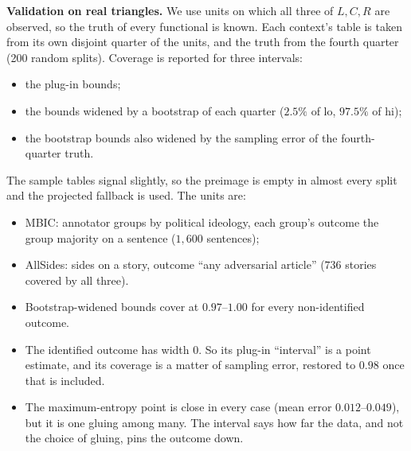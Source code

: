 \documentclass[11pt]{article}
\theoremstyle{definition}
\theoremstyle{remark}
\begin{document}
\textbf{Validation on real triangles.} We use units on which all three of $L,C,R$ are observed, so the truth of every functional is known. Each context's table is taken from its own disjoint quarter of the units, and the truth from the fourth quarter (200 random splits). Coverage is reported for three intervals:
\begin{itemize}
  \item the plug-in bounds;
  \item the bounds widened by a bootstrap of each quarter ($2.5\%$ of lo, $97.5\%$ of hi);
  \item the bootstrap bounds also widened by the sampling error of the fourth-quarter truth.
\end{itemize}
The sample tables signal slightly, so the preimage is empty in almost every split and the projected fallback is used. The units are:
\begin{itemize}
  \item MBIC: annotator groups by political ideology, each group's outcome the group majority on a sentence ($1{,}600$ sentences);
  \item AllSides: sides on a story, outcome ``any adversarial article'' ($736$ stories covered by all three).
\end{itemize}
\begin{center}\small
{}
\end{center}
\begin{itemize}
  \item Bootstrap-widened bounds cover at $0.97$--$1.00$ for every non-identified outcome.
  \item The identified outcome has width $0$. So its plug-in ``interval'' is a point estimate, and its coverage is a matter of sampling error, restored to $0.98$ once that is included.
  \item The maximum-entropy point is close in every case (mean error $0.012$--$0.049$), but it is one gluing among many. The interval says how far the data, and not the choice of gluing, pins the outcome down.
\end{itemize}
\end{document}
